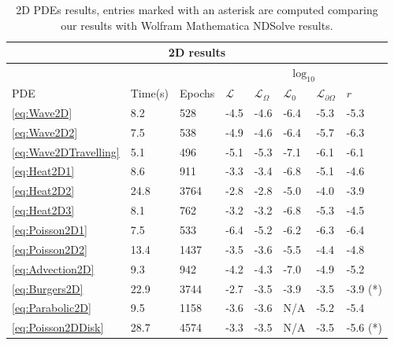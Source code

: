 \documentclass{article}
\newcommand{\mc}{\mathcal}
\begin{document}
\begin{table}
\begin{center}
\renewcommand{\arraystretch}{1.5}
\begin{tabular}{ |p{1cm}|p{1.3cm}|p{1.3cm}|p{1.0cm}|p{1.0cm}|p{1.0cm}|p{1.0cm}|p{1.0cm}|  }
\hline
\multicolumn{8}{|c|}{2D results} \\
\hline
\multicolumn{3}{|c|}{}&\multicolumn{5}{|c|}{$\log_{10}$}\\
\hline
PDE    & Time(s)& Epochs &  $\mc{L}$ &$\mc{L}_{\Omega}$ &$\mc{L}_0$ &$\mc{L}_{\partial\Omega}$ & $r$ \\
\hline
\ref{eq:Wave2D}            &    8.2   &   528   &  -4.5  & -4.6  & -6.4  & -5.3  &  -5.3 \\
\hline
\ref{eq:Wave2D2}           &    7.5   &   538   &  -4.9  & -4.6  & -6.4  & -5.7  &  -6.3 \\
\hline
\ref{eq:Wave2DTravelling}  &    5.1   &   496   &  -5.1  & -5.3  & -7.1  & -6.1  &  -6.1 \\
\hline
\ref{eq:Heat2D1}           &    8.6   &   911   &  -3.3  & -3.4  & -6.8  & -5.1  &  -4.6  \\
\hline
\ref{eq:Heat2D2}           &    24.8  &   3764  &  -2.8  & -2.8  & -5.0  & -4.0  &  -3.9 \\
\hline
\ref{eq:Heat2D3}           &    8.1   &   762   &  -3.2  & -3.2  & -6.8  & -5.3  &  -4.5 \\
\hline
\ref{eq:Poisson2D1}        &    7.5   &   533   &  -6.4  & -5.2  & -6.2  & -6.3  &  -6.4 \\
\hline
\ref{eq:Poisson2D2}        &    13.4  &   1437  &  -3.5  & -3.6  & -5.5  & -4.4  &  -4.8 \\
\hline
\ref{eq:Advection2D}       &    9.3   &   942   &  -4.2  & -4.3  & -7.0  & -4.9  &  -5.2 \\
\hline
\ref{eq:Burgers2D}         &    22.9  &   3744  &  -2.7  & -3.5  & -3.9  & -3.5  &  -3.9 (*) \\
\hline
\ref{eq:Parabolic2D}       &    9.5   &   1158  &  -3.6  & -3.6  & N/A   & -5.2  &  -5.4 \\
\hline 
\ref{eq:Poisson2DDisk}     &    28.7  &   4574  &  -3.3  & -3.5  &   N/A    & -3.5  &  -5.6 (*) \\
\hline 
\end{tabular}
\caption{2D PDEs results,  entries marked with an asterisk are computed comparing our results with \textsf{Wolfram Mathematica NDSolve} results.\label{tab:2D}}
\end{center}
\end{table}
\end{document}
